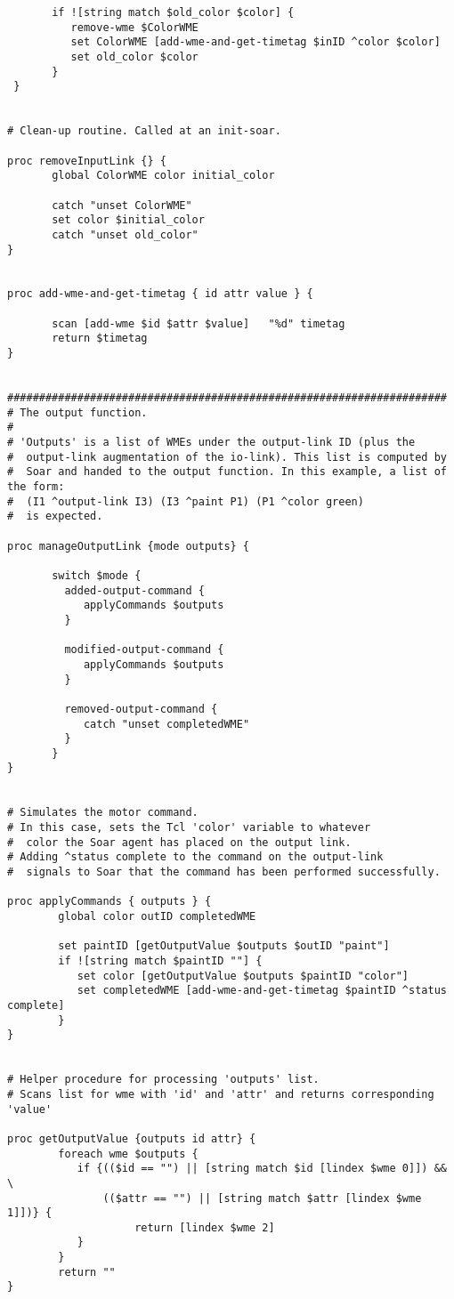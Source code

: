 \begin{verbatim}
       if ![string match $old_color $color] {
          remove-wme $ColorWME
          set ColorWME [add-wme-and-get-timetag $inID ^color $color]
          set old_color $color
       }
 }
 

# Clean-up routine. Called at an init-soar.

proc removeInputLink {} {
       global ColorWME color initial_color

       catch "unset ColorWME"
       set color $initial_color
       catch "unset old_color"
}
 

proc add-wme-and-get-timetag { id attr value } {

       scan [add-wme $id $attr $value]   "%d" timetag
       return $timetag
}
 

#####################################################################
# The output function. 
#
# 'Outputs' is a list of WMEs under the output-link ID (plus the 
#  output-link augmentation of the io-link). This list is computed by
#  Soar and handed to the output function. In this example, a list of the form:
#  (I1 ^output-link I3) (I3 ^paint P1) (P1 ^color green)
#  is expected. 

proc manageOutputLink {mode outputs} {    

       switch $mode {
         added-output-command {
            applyCommands $outputs
         } 
         
         modified-output-command {
            applyCommands $outputs    
         }
 
         removed-output-command {
            catch "unset completedWME"
         }
       }
}


# Simulates the motor command.
# In this case, sets the Tcl 'color' variable to whatever
#  color the Soar agent has placed on the output link.
# Adding ^status complete to the command on the output-link
#  signals to Soar that the command has been performed successfully.

proc applyCommands { outputs } {
        global color outID completedWME

        set paintID [getOutputValue $outputs $outID "paint"]
        if ![string match $paintID ""] {
           set color [getOutputValue $outputs $paintID "color"]
           set completedWME [add-wme-and-get-timetag $paintID ^status complete]
        }
}


# Helper procedure for processing 'outputs' list.
# Scans list for wme with 'id' and 'attr' and returns corresponding 'value'

proc getOutputValue {outputs id attr} {
        foreach wme $outputs {
           if {(($id == "") || [string match $id [lindex $wme 0]]) && \
               (($attr == "") || [string match $attr [lindex $wme 1]])} {
                    return [lindex $wme 2]
           }
        }
        return ""
}




\end{verbatim}
